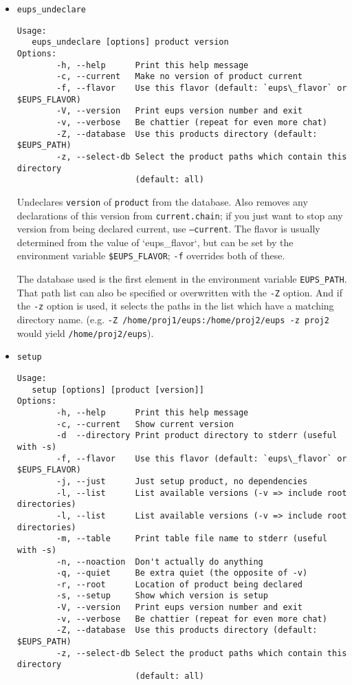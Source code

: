 \documentclass{article}
\newcommand{\code}[1]{\texttt{#1}}
\begin{document}
\begin{itemize}

  \item \code{eups\_undeclare}
\begin{verbatim}
Usage:
   eups_undeclare [options] product version
Options:
        -h, --help      Print this help message
        -c, --current   Make no version of product current
        -f, --flavor    Use this flavor (default: `eups\_flavor` or $EUPS_FLAVOR)
        -V, --version   Print eups version number and exit
        -v, --verbose   Be chattier (repeat for even more chat)
        -Z, --database  Use this products directory (default: $EUPS_PATH)
        -z, --select-db Select the product paths which contain this directory 
                        (default: all)
\end{verbatim}
  
Undeclares \code{version} of \code{product} from the database. Also
removes any declarations of this version from \code{current.chain}; if
you just want to stop any version from being declared current, use
\code{--current}. The flavor is usually determined from the value
of `eups\_flavor`, but can be set by the
environment variable \code{\$EUPS\_FLAVOR}; \code{-f} overrides
both of these.

The database used is the first element in the environment
variable \code{EUPS\_PATH}. That path list can also be specified or
overwritten with the \code{-Z} option. And if the \code{-z} option is
used, it selects the paths in the list which have a matching directory
name. (e.g. \code{-Z /home/proj1/eups:/home/proj2/eups -z proj2} would
yield \code{/home/proj2/eups}).


\item \code{setup}
\begin{verbatim}
Usage:
   setup [options] [product [version]]
Options:
        -h, --help      Print this help message
        -c, --current   Show current version
        -d  --directory Print product directory to stderr (useful with -s)
        -f, --flavor    Use this flavor (default: `eups\_flavor` or $EUPS_FLAVOR)
        -j, --just      Just setup product, no dependencies
        -l, --list      List available versions (-v => include root directories)
        -l, --list      List available versions (-v => include root directories)
        -m, --table     Print table file name to stderr (useful with -s)
        -n, --noaction  Don't actually do anything
        -q, --quiet     Be extra quiet (the opposite of -v)
        -r, --root      Location of product being declared
        -s, --setup     Show which version is setup
        -V, --version   Print eups version number and exit
        -v, --verbose   Be chattier (repeat for even more chat)
        -Z, --database  Use this products directory (default: $EUPS_PATH)
        -z, --select-db Select the product paths which contain this directory 
                        (default: all)
\end{verbatim}


\end{itemize}
\end{document}
